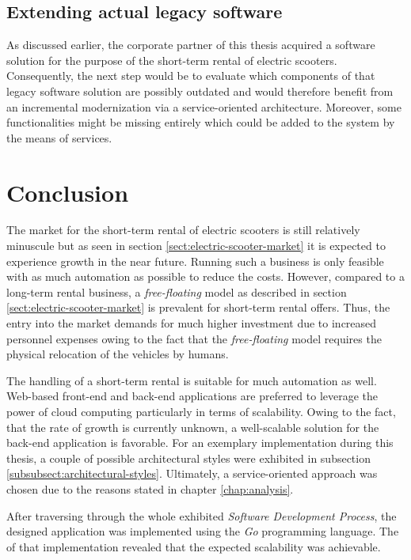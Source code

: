 \documentclass[12pt,a4paper,twoside]{report}
\begin{document}
\section{Extending actual legacy software}

As discussed earlier, the corporate partner of this thesis acquired a
software solution for the purpose of the short-term rental of electric scooters.
Consequently, the next step would be to evaluate which components of that
legacy software solution are possibly outdated and would therefore benefit
from an incremental modernization via a service-oriented architecture.
Moreover, some functionalities might be missing entirely which could be added
to the system by the means of services.



\chapter{Conclusion} \label{chap:conclusion}

The market for the short-term rental of electric scooters is still relatively
minuscule but as seen in section \ref{sect:electric-scooter-market} it is
expected to experience growth in the near future.
Running such a business is only feasible with as much automation as possible
to reduce the costs. However, compared to a long-term rental business,
a \textit{free-floating} model as described in section \ref{sect:electric-scooter-market}
is prevalent for short-term rental offers. Thus, the entry into the market
demands for much higher investment due to increased personnel expenses
owing to the fact that the \textit{free-floating} model requires
the physical relocation of the vehicles by humans.

The handling of a short-term rental is suitable for much automation as well.
Web-based front-end and back-end applications are preferred to leverage
the power of cloud computing particularly in terms of scalability.
Owing to the fact, that the rate of growth is currently unknown, a well-scalable
solution for the back-end application is favorable.
For an exemplary implementation during this thesis, a couple of possible
architectural styles were exhibited in subsection \ref{subsubsect:architectural-styles}.
Ultimately, a service-oriented approach was chosen due to the reasons stated
in chapter \ref{chap:analysis}.

After traversing through the whole exhibited \textit{Software Development Process},
the designed application was implemented using the \textit{Go} programming language.
The \textit{} of that implementation revealed that
the expected scalability was achievable.
\end{document}
